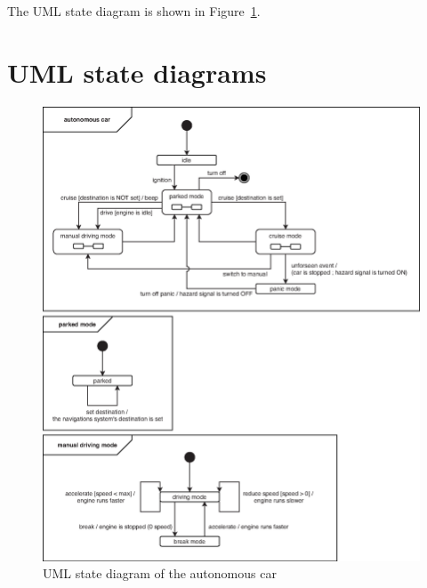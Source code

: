 \documentclass[12pt]{article}
\begin{document}
\begin{spacing}{1.5}
\noindent The UML state diagram is shown in Figure~\ref{fig:state-diagram}.

\newpage

\section{UML state diagrams}

\begin{figure}[h!]
	\centering
		\includegraphics[width=1\textwidth]{./figures/eps/EFSM.eps}
		  \caption{UML state diagram of the autonomous car}
  \label{fig:state-diagram}
\end{figure}
\begin{figure}[h!]
	\centering

\end{figure}
\end{spacing}
\end{document}
